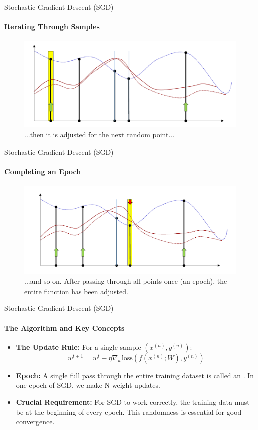 \begin{frame}{Stochastic Gradient Descent (SGD)}
    \framesubtitle{Iterating Through Samples}
    \begin{figure}
        \centering
        \includegraphics[width=0.7\linewidth]{images/sgd_step_2.png}
        \caption{...then it is adjusted for the next random point...}
    \end{figure}
\end{frame}

\begin{frame}{Stochastic Gradient Descent (SGD)}
    \framesubtitle{Completing an Epoch}
    \begin{figure}
        \centering
        \includegraphics[width=0.7\linewidth]{images/sgd_step_3.png}
        \caption{...and so on. After passing through all points once (an epoch), the entire function has been adjusted.}
    \end{figure}
\end{frame}

\begin{frame}{Stochastic Gradient Descent (SGD)}
    \framesubtitle{The Algorithm and Key Concepts}
    \begin{itemize}
        \item \textbf{The Update Rule:} For a single sample $(x^{(n)}, y^{(n)})$:
        \[ w^{t+1} = w^{t} - \eta \nabla_{w}\text{loss}(f(x^{(n)}; W), y^{(n)}) \]
        \item \textbf{Epoch:} A single full pass through the entire training dataset is called an . In one epoch of SGD, we make N weight updates.
        \item \textbf{Crucial Requirement:} For SGD to work correctly, the training data must be  at the beginning of every epoch. This randomness is essential for good convergence.
    \end{itemize}
\end{frame}

